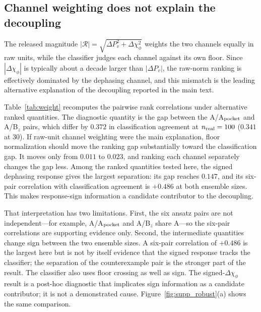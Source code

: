 \documentclass[aip,jap,reprint,onecolumn,superscriptaddress,longbibliography]{revtex4-2}
\begin{document}
\subsection{Channel weighting does not explain the decoupling}
The released magnitude $|\mathcal{R}|=\sqrt{\Delta P_v^2+\Delta\chi_\phi^2}$
weights the two channels equally in raw units, while the classifier judges each
channel against its own floor. Since $|\Delta\chi_\phi|$ is typically about a
decade larger than $|\Delta P_v|$, the raw-norm ranking is effectively
dominated by the dephasing channel, and this mismatch is the leading
alternative explanation of the decoupling reported in the main text.

Table~\ref{tab:weight} recomputes the pairwise rank correlations under
alternative ranked quantities. The diagnostic quantity is the gap between the
A/A$_{\rm pocket}$ and A/B$_z$ pairs, which differ by $0.372$
in classification agreement at $n_{\rm real}=100$ ($0.341$ at $30$). If raw-unit
channel weighting were the main explanation, floor normalization should move
the ranking gap substantially toward the classification gap. It moves only from $0.011$ to $0.023$, and ranking each channel separately
changes the gap less. Among the ranked quantities tested here, the signed
dephasing response gives the largest separation: its gap reaches $0.147$, and
its six-pair correlation with classification agreement is $+0.486$ at both
ensemble sizes. This makes response-sign information a
candidate contributor to the decoupling.

That interpretation has two limitations. First, the six ansatz pairs are not
independent---for example, A/A$_{\rm pocket}$ and A/B$_z$ share A---so the
six-pair correlations are supporting evidence only. Second, the intermediate
quantities change sign between the two ensemble sizes. A six-pair correlation of $+0.486$ is the largest here
but is not by itself evidence that the signed response tracks the classifier;
the separation of the counterexample pair is the stronger part of the result.
The classifier also uses floor crossing as well as sign. The
signed-$\Delta\chi_\phi$ result is a post-hoc diagnostic that implicates sign
information as a candidate contributor; it is not a demonstrated cause. Figure~\ref{fig:supp_robust}(a) shows the same comparison.
\end{document}
